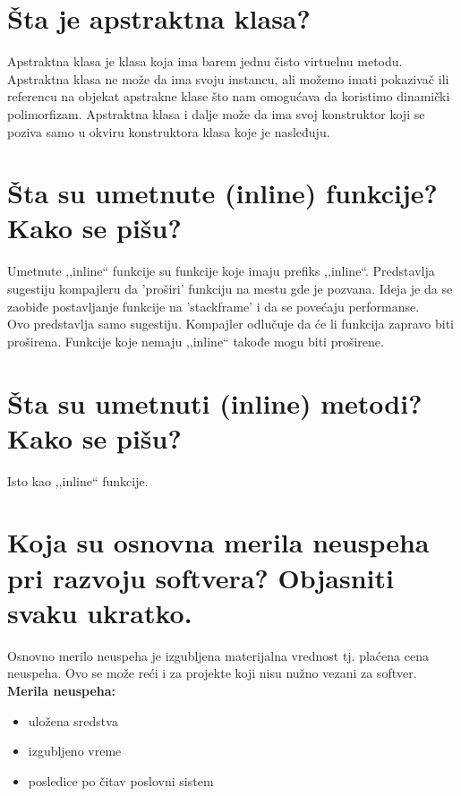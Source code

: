 \documentclass[a4paper]{article}
\begin{document}
\section{Šta je apstraktna klasa?}
  Apstraktna klasa je klasa koja ima barem jednu čisto virtuelnu metodu. Apstraktna klasa ne može da
  ima svoju instancu, ali možemo imati pokazivač ili referencu na objekat apstrakne klase što nam
  omogućava da koristimo dinamički polimorfizam. Apstraktna klasa i dalje može da ima svoj konstruktor
  koji se poziva samo u okviru konstruktora klasa koje je nasleđuju.

\section{Šta su umetnute (inline) funkcije? Kako se pišu?}
  Umetnute ,,inline`` funkcije su funkcije koje imaju prefiks ,,inline``. Predstavlja sugestiju kompajleru
  da 'proširi' funkciju na mestu gde je pozvana. Ideja je da se zaobiđe postavljanje funkcije
  na 'stackframe' i da se povećaju performanse. \\
  \indent Ovo predstavlja samo sugestiju. Kompajler odlučuje da će li funkcija zapravo biti proširena. 
  Funkcije koje nemaju ,,inline`` takođe mogu biti proširene.

\section{Šta su umetnuti (inline) metodi? Kako se pišu?}
  Isto kao ,,inline`` funkcije.
  
\section{Koja su osnovna merila neuspeha pri razvoju softvera? Objasniti svaku ukratko.}
  Osnovno merilo neuspeha je izgubljena materijalna vrednost tj. plaćena cena neuspeha. Ovo se
  može reći i za projekte koji nisu nužno vezani za softver. \\
  \textbf{Merila neuspeha:}
  \begin{itemize}
    \item uložena sredstva 
    \item izgubljeno vreme 
    \item posledice po čitav poslovni sistem 
  \end{itemize}
\end{document}
